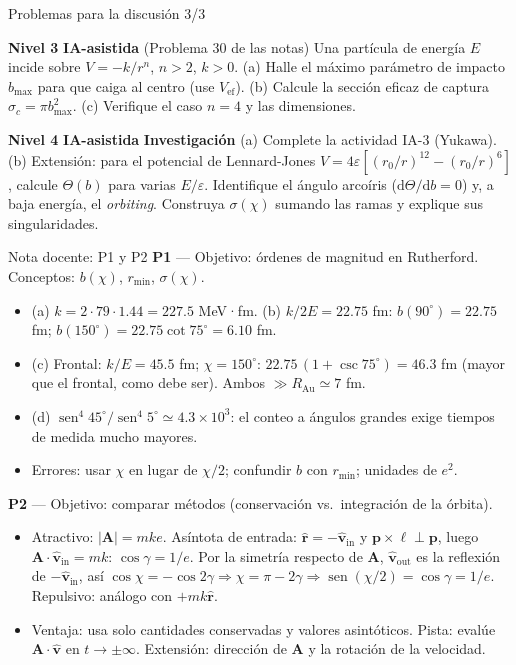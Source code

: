 \documentclass[aspectratio=169]{beamer}
\newif\ifdocente
\providecommand{\sen}{}
\renewcommand{\sen}{\operatorname{sen}}
\newcommand{\rmin}{r_{\min}}
\newcommand{\dd}{\mathrm{d}}
\newcommand{\IAasistida}{\colorbox{yellow!30}{\scriptsize\textbf{IA-asistida}}}
\newcommand{\nivel}[1]{\colorbox{blue!12}{\scriptsize\textbf{Nivel #1}}}
\begin{document}
\begin{frame}{Problemas para la discusión 3/3}
\small
\begin{description}[P0]
  \item[P7] \nivel{3} \IAasistida{} (Problema 30 de las notas)
        Una partícula de energía $E$ incide sobre $V=-k/r^{n}$, $n>2$, $k>0$.
        (a) Halle el máximo parámetro de impacto $b_{\max}$ para que caiga al centro
        (use $V_{\text{ef}}$). (b) Calcule la sección eficaz de captura
        $\sigma_c=\pi b_{\max}^{2}$. (c) Verifique el caso $n=4$ y las dimensiones.
  \item[P8] \nivel{4} \IAasistida{} \textbf{Investigación}
        (a) Complete la actividad IA-3 (Yukawa).
        (b) Extensión: para el potencial de Lennard-Jones
        $V=4\varepsilon[(r_0/r)^{12}-(r_0/r)^{6}]$, calcule $\Theta(b)$ para varias $E/\varepsilon$.
        Identifique el ángulo arcoíris ($\dd\Theta/\dd b=0$) y, a baja energía, el
        \emph{orbiting}. Construya $\sigma(\chi)$ sumando las ramas y explique sus
        singularidades.
\end{description}
\end{frame}

\ifdocente
\begin{frame}{Nota docente: P1 y P2}
\footnotesize
\textbf{P1} — Objetivo: órdenes de magnitud en Rutherford. Conceptos: $b(\chi)$, $\rmin$, $\sigma(\chi)$.
\begin{itemize}
  \item (a) $k=2\cdot79\cdot1.44=227.5$ MeV·fm. (b) $k/2E=22.75$ fm: $b(90^\circ)=22.75$ fm;
        $b(150^\circ)=22.75\cot75^\circ=6.10$ fm.
  \item (c) Frontal: $k/E=45.5$ fm; $\chi=150^\circ$: $22.75\,(1+\csc75^\circ)=46.3$ fm
        (mayor que el frontal, como debe ser). Ambos $\gg R_{\text{Au}}\simeq7$ fm.
  \item (d) $\sen^4 45^\circ/\sen^4 5^\circ\simeq4.3\times10^{3}$: el conteo a ángulos grandes
        exige tiempos de medida mucho mayores.
  \item Errores: usar $\chi$ en lugar de $\chi/2$; confundir $b$ con $\rmin$; unidades de $e^2$.
\end{itemize}
\textbf{P2} — Objetivo: comparar métodos (conservación vs.\ integración de la órbita).
\begin{itemize}
  \item Atractivo: $|\mathbf A|=mke$. Asíntota de entrada: $\hat{\mathbf r}=-\hat{\mathbf v}_{\text{in}}$ y
        $\mathbf p\times\boldsymbol\ell\perp\mathbf p$, luego $\mathbf A\cdot\hat{\mathbf v}_{\text{in}}=mk$:
        $\cos\gamma=1/e$. Por la simetría respecto de $\mathbf A$,
        $\hat{\mathbf v}_{\text{out}}$ es la reflexión de $-\hat{\mathbf v}_{\text{in}}$, así
        $\cos\chi=-\cos2\gamma\Rightarrow\chi=\pi-2\gamma\Rightarrow\sen(\chi/2)=\cos\gamma=1/e$.
        Repulsivo: análogo con $+mk\hat{\mathbf r}$.
  \item Ventaja: usa solo cantidades conservadas y valores asintóticos. Pista: evalúe
        $\mathbf A\cdot\hat{\mathbf v}$ en $t\to\pm\infty$. Extensión: dirección de $\mathbf A$ y la
        rotación de la velocidad.
\end{itemize}
\end{frame}
\end{document}
